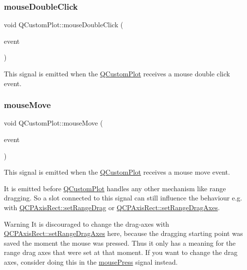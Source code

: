 \subsubsection{\texorpdfstring{mouse\+Double\+Click}{mouseDoubleClick}}
{\footnotesize\ttfamily void Q\+Custom\+Plot\+::mouse\+Double\+Click (\begin{DoxyParamCaption}\item[{Q\+Mouse\+Event $\ast$}]{event }\end{DoxyParamCaption})\hspace{0.3cm}{\ttfamily [signal]}}

This signal is emitted when the \hyperlink{class_q_custom_plot}{Q\+Custom\+Plot} receives a mouse double click event. \mbox{\label{class_q_custom_plot_a742ca4f94688bed2a685fd8a56ce5704}} 
\subsubsection{\texorpdfstring{mouse\+Move}{mouseMove}}
{\footnotesize\ttfamily void Q\+Custom\+Plot\+::mouse\+Move (\begin{DoxyParamCaption}\item[{Q\+Mouse\+Event $\ast$}]{event }\end{DoxyParamCaption})\hspace{0.3cm}{\ttfamily [signal]}}

This signal is emitted when the \hyperlink{class_q_custom_plot}{Q\+Custom\+Plot} receives a mouse move event.

It is emitted before \hyperlink{class_q_custom_plot}{Q\+Custom\+Plot} handles any other mechanism like range dragging. So a slot connected to this signal can still influence the behaviour e.\+g. with \hyperlink{class_q_c_p_axis_rect_ae6aef2f7211ba6097c925dcd26008418}{Q\+C\+P\+Axis\+Rect\+::set\+Range\+Drag} or \hyperlink{class_q_c_p_axis_rect_a648cce336bd99daac4a5ca3e5743775d}{Q\+C\+P\+Axis\+Rect\+::set\+Range\+Drag\+Axes}.

\begin{DoxyWarning}{Warning}
It is discouraged to change the drag-\/axes with \hyperlink{class_q_c_p_axis_rect_a648cce336bd99daac4a5ca3e5743775d}{Q\+C\+P\+Axis\+Rect\+::set\+Range\+Drag\+Axes} here, because the dragging starting point was saved the moment the mouse was pressed. Thus it only has a meaning for the range drag axes that were set at that moment. If you want to change the drag axes, consider doing this in the \hyperlink{class_q_custom_plot_aca75bf9afb5dd19349c375de2a87a051}{mouse\+Press} signal instead. 
\end{DoxyWarning}
\mbox{\label{class_q_custom_plot_aca75bf9afb5dd19349c375de2a87a051}} 
